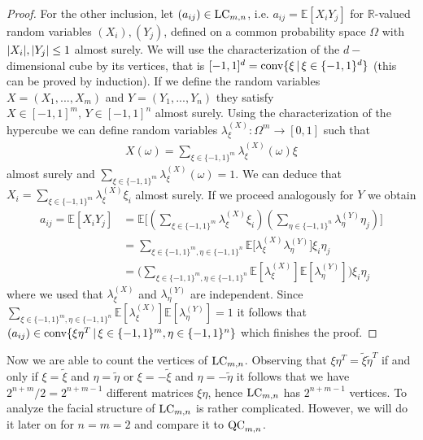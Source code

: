 \begin{proof}
	For the other inclusion, let $ (a_{ij}) \in \textup{LC}_{m,n} $, i.e. $ a_{ij} = \mathbb{E}[X_iY_j] $ for $ \mathbb{R} $-valued random variables $ (X_i),(Y_j) $, defined on a common probability space $ \Omega $ with $ {\left|{X_i}\right|},{\left|{Y_j}\right|} \le 1 $ almost surely. 
	We will use the characterization of the $ d-$dimensional cube by its vertices, that is $ [-1,1]^d = \textup{conv} \{\xi \, | \, \xi \in \{-1,1 \}^d \}$ (this can be proved by induction). 
	If we define the random variables $ X= (X_1,...,X_m) $ and $ Y= (Y_1,...,Y_n) $ they satisfy $ X \in [-1,1]^m, \, Y \in [-1,1]^n $ almost surely. Using the characterization of the hypercube we can define random variables $ \lambda_{\xi}^{(X)}: \Omega^m \to [0,1] $ such that 
	\begin{align*}
		X(\omega) = \sum_{\xi \in \{-1,1\}^m}\lambda_{\xi}^{(X)}(\omega)\xi
	\end{align*} 
	almost surely 
	and $ \sum_{\xi \in \{-1,1\}^m}\lambda_{\xi}^{(X)}(\omega) = 1  $. We can deduce that 
	$X_i =  \sum_{\xi \in \{-1,1\}^m}\lambda_{\xi}^{(X)}\xi_i $ almost surely.
	If we proceed analogously for $ Y $ we obtain
	\begin{align*}
		a_{ij} = \mathbb{E}[X_iY_j] &= \mathbb{E} \big [  (\sum_{\xi \in \{-1,1\}^m}\lambda_{\xi}^{(X)}\xi_i ) (\sum_{\eta \in \{-1,1\}^n}\lambda_{\eta}^{(Y)}\eta_j ) \big ]   \\
		&= \sum_{\xi \in \{-1,1\}^m, \eta \in \{-1,1\}^n} \mathbb{E}\big [\lambda_{\xi}^{(X)}\lambda_{\eta}^{(Y)} \big ] \xi_i \eta_j  \\
		&= \big (\sum_{\xi \in \{-1,1\}^m, \eta \in \{-1,1\}^n}\mathbb{E} [\lambda_{\xi}^{(X)} ]\mathbb{E}[\lambda_{\eta}^{(Y)}]\big )\xi_i\eta_j
	\end{align*}
	where we used that $ \lambda_{\xi}^{(X)} $ and $ \lambda_{\eta}^{(Y)} $ are independent.
	Since $
		\sum_{\xi \in \{-1,1\}^m, \eta \in \{-1,1\}^n}\mathbb{E} [\lambda_{\xi}^{(X)} ]\mathbb{E}[\lambda_{\eta}^{(Y)}] = 1 $ it follows that $ (a_{ij}) \in  \textup{conv} \{  \xi\eta^T \, | \, \xi \in \{-1,1\}^m, \eta \in \{-1,1\}^n     \}$
 which finishes the proof.
\end{proof}
Now we are able to count the vertices of $ \textup{LC}_{m,n} $. Observing that $ \xi \eta^T = \tilde{\xi} \tilde{\eta}^T $ if and only if $ \xi = \tilde{\xi} $ and $ \eta = \tilde{\eta} $ or $ \xi = -\tilde{\xi} $ and $ \eta = -\tilde{\eta} $ it follows that we have $ 2^{n+m}/2 = 2^{n+m-1} $ different matrices $ \xi \eta $, hence $ \textup{LC}_{m,n} $ has $ 2^{n+m-1} $ vertices. To analyze the facial structure of $ \textup{LC}_{m,n} $ is rather complicated. 
However, we will do it later on for $ n=m=2 $ and compare it to $ \textup{QC}_{m,n} $.

